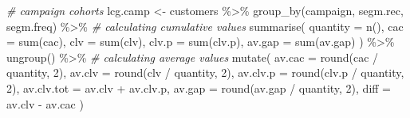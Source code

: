 \documentclass[
]{book}
\newenvironment{Shaded}{\begin{snugshade}}{\end{snugshade}}
\newcommand{\AttributeTok}[1]{\textcolor[rgb]{0.77,0.63,0.00}{#1}}
\newcommand{\CommentTok}[1]{\textcolor[rgb]{0.56,0.35,0.01}{\textit{#1}}}
\newcommand{\DecValTok}[1]{\textcolor[rgb]{0.00,0.00,0.81}{#1}}
\newcommand{\FunctionTok}[1]{\textcolor[rgb]{0.00,0.00,0.00}{#1}}
\newcommand{\NormalTok}[1]{#1}
\newcommand{\OtherTok}[1]{\textcolor[rgb]{0.56,0.35,0.01}{#1}}
\newcommand{\SpecialCharTok}[1]{\textcolor[rgb]{0.00,0.00,0.00}{#1}}
\begin{document}
\begin{Shaded}
\begin{Highlighting}[]
\CommentTok{\# campaign cohorts}
\NormalTok{lcg.camp }\OtherTok{\textless{}{-}}\NormalTok{ customers }\SpecialCharTok{\%\textgreater{}\%}
    \FunctionTok{group\_by}\NormalTok{(campaign, segm.rec, segm.freq) }\SpecialCharTok{\%\textgreater{}\%}
    \CommentTok{\# calculating cumulative values}
    \FunctionTok{summarise}\NormalTok{(}
        \AttributeTok{quantity =} \FunctionTok{n}\NormalTok{(),}
        \AttributeTok{cac =} \FunctionTok{sum}\NormalTok{(cac),}
        \AttributeTok{clv =} \FunctionTok{sum}\NormalTok{(clv),}
        \AttributeTok{clv.p =} \FunctionTok{sum}\NormalTok{(clv.p),}
        \AttributeTok{av.gap =} \FunctionTok{sum}\NormalTok{(av.gap)}
\NormalTok{    ) }\SpecialCharTok{\%\textgreater{}\%}
    \FunctionTok{ungroup}\NormalTok{() }\SpecialCharTok{\%\textgreater{}\%}
    \CommentTok{\# calculating average values}
    \FunctionTok{mutate}\NormalTok{(}
        \AttributeTok{av.cac =} \FunctionTok{round}\NormalTok{(cac }\SpecialCharTok{/}\NormalTok{ quantity, }\DecValTok{2}\NormalTok{),}
        \AttributeTok{av.clv =} \FunctionTok{round}\NormalTok{(clv }\SpecialCharTok{/}\NormalTok{ quantity, }\DecValTok{2}\NormalTok{),}
        \AttributeTok{av.clv.p =} \FunctionTok{round}\NormalTok{(clv.p }\SpecialCharTok{/}\NormalTok{ quantity, }\DecValTok{2}\NormalTok{),}
        \AttributeTok{av.clv.tot =}\NormalTok{ av.clv }\SpecialCharTok{+}\NormalTok{ av.clv.p,}
        \AttributeTok{av.gap =} \FunctionTok{round}\NormalTok{(av.gap }\SpecialCharTok{/}\NormalTok{ quantity, }\DecValTok{2}\NormalTok{),}
        \AttributeTok{diff =}\NormalTok{ av.clv }\SpecialCharTok{{-}}\NormalTok{ av.cac}
\NormalTok{    )}


\end{Highlighting}
\end{Shaded}
\end{document}
